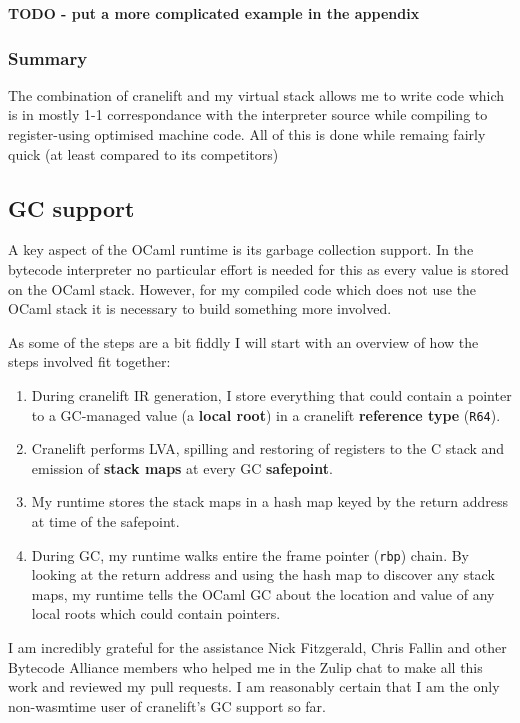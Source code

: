 \textbf{TODO - put a more complicated example in the appendix}

\subsubsection{Summary}

The combination of cranelift and my virtual stack allows me to write code which is in mostly 1-1
correspondance with the interpreter source while compiling to register-using optimised machine
code. All of this is done while remaing fairly quick (at least compared to its competitors)

\subsection{GC support}

A key aspect of the OCaml runtime is its garbage collection support. In the bytecode interpreter no
particular effort is needed for this as every value is stored on the OCaml stack. However, for my
compiled code which does not use the OCaml stack it is necessary to build something more involved.

As some of the steps are a bit fiddly I will start with an overview of how the steps involved fit
together:

\begin{enumerate}
      \item During cranelift IR generation, I store everything that could contain a pointer to a
            GC-managed value (a \textbf{local root}) in a cranelift \textbf{reference type}
            (\texttt{R64}).
      \item Cranelift performs LVA, spilling and restoring of registers to the C stack and emission
            of \textbf{stack maps} at every GC \textbf{safepoint}.
      \item My runtime stores the stack maps in a hash map keyed by the return address at time of
            the safepoint.
      \item During GC, my runtime walks entire the frame pointer (\texttt{rbp}) chain. By looking
            at the return address and using the hash map to discover any stack maps, my runtime
            tells the OCaml GC about the location and value of any local roots which could contain
            pointers.
\end{enumerate}

I am incredibly grateful for the assistance Nick Fitzgerald, Chris Fallin and other Bytecode
Alliance members who helped me in the Zulip chat to make all this work and reviewed my pull
requests. I am reasonably certain that I am the only non-wasmtime user of cranelift's GC support so
far.

